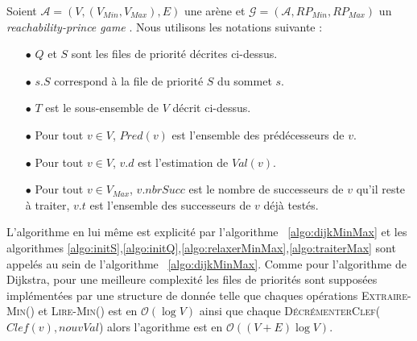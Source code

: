 Soient $\mathcal{A} = (V, (V_{Min}, V_{Max}), E) $ une arène et $\mathcal{G} = (\mathcal{A},RP_{Min},RP_{Max})$ un \og \textit{reachability-prince game} \fg. Nous utilisons les notations suivante : 
\begin{enumerate} 
	\item[$\bullet$]$Q$ et $S$ sont les files de priorité décrites ci-dessus.
	\item[$\bullet$]$s.S$  correspond à la file de priorité $S$ du sommet $s$.
	\item[$\bullet$]$T$ est le sous-ensemble de $V$ décrit ci-dessus.
	\item[$\bullet$]Pour tout $v \in V$, $Pred(v)$ est l'ensemble des prédécesseurs de $v$.
	\item[$\bullet$]Pour tout $v \in V$, $v.d$ est l'estimation de $Val(v)$.
	\item[$\bullet$]Pour tout $v \in V_{Max}$, $v.nbrSucc$ est le nombre de successeurs de $v$ qu'il reste à traiter, $v.t$ est l'ensemble des successeurs de $v$ déjà testés.
\end{enumerate}

L'algorithme en lui même est explicité par l'algorithme ~\ref{algo:dijkMinMax} et les algorithmes \ref{algo:initS},\ref{algo:initQ},\ref{algo:relaxerMinMax},\ref{algo:traiterMax} sont appelés au sein de l'algorithme ~\ref{algo:dijkMinMax}.
Comme pour l'algorithme de Dijkstra, pour une meilleure complexité les files de priorités sont supposées implémentées par une structure de donnée telle que chaques opérations \textsc{Extraire-Min}() et \textsc{Lire-Min()} est en $\mathcal{O}(\log V)$ ainsi que chaque \textsc{DécrémenterClef}($Clef(v),nouvVal$) alors l'agorithme est en $\mathcal{O}((V + E) \log V)$.\\ 


